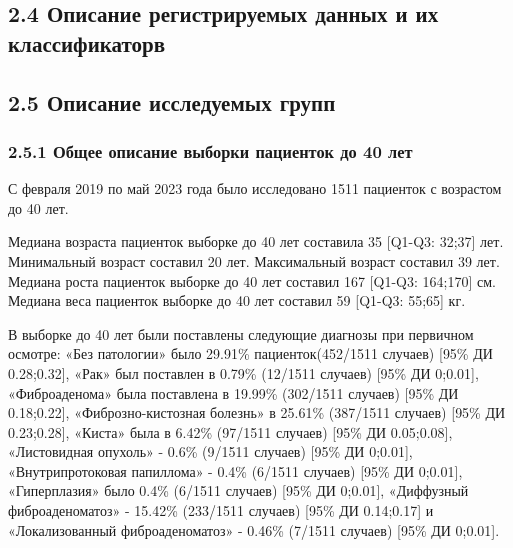 \documentclass[
]{article}
\begin{document}
\hypertarget{ux43eux43fux438ux441ux430ux43dux438ux435-ux440ux435ux433ux438ux441ux442ux440ux438ux440ux443ux435ux43cux44bux445-ux434ux430ux43dux43dux44bux445-ux438-ux438ux445-ux43aux43bux430ux441ux441ux438ux444ux438ux43aux430ux442ux43eux440ux432}{%
\subsection{2.4 Описание регистрируемых данных и их
классификаторв}\label{ux43eux43fux438ux441ux430ux43dux438ux435-ux440ux435ux433ux438ux441ux442ux440ux438ux440ux443ux435ux43cux44bux445-ux434ux430ux43dux43dux44bux445-ux438-ux438ux445-ux43aux43bux430ux441ux441ux438ux444ux438ux43aux430ux442ux43eux440ux432}}

\hypertarget{ux43eux43fux438ux441ux430ux43dux438ux435-ux438ux441ux441ux43bux435ux434ux443ux435ux43cux44bux445-ux433ux440ux443ux43fux43f}{%
\subsection{2.5 Описание исследуемых
групп}\label{ux43eux43fux438ux441ux430ux43dux438ux435-ux438ux441ux441ux43bux435ux434ux443ux435ux43cux44bux445-ux433ux440ux443ux43fux43f}}

\hypertarget{ux43eux431ux449ux435ux435-ux43eux43fux438ux441ux430ux43dux438ux435-ux432ux44bux431ux43eux440ux43aux438-ux43fux430ux446ux438ux435ux43dux442ux43eux43a-ux434ux43e-40-ux43bux435ux442}{%
\subsubsection{2.5.1 Общее описание выборки пациенток до 40
лет}\label{ux43eux431ux449ux435ux435-ux43eux43fux438ux441ux430ux43dux438ux435-ux432ux44bux431ux43eux440ux43aux438-ux43fux430ux446ux438ux435ux43dux442ux43eux43a-ux434ux43e-40-ux43bux435ux442}}

С февраля 2019 по май 2023 года было исследовано 1511 пациенток с
возрастом до 40 лет.

Медиана возраста пациенток выборке до 40 лет составила 35 {[}Q1-Q3:
32;37{]} лет. Минимальный возраст составил 20 лет. Максимальный возраст
составил 39 лет. Медиана роста пациенток выборке до 40 лет составил 167
{[}Q1-Q3: 164;170{]} см. Медиана веса пациенток выборке до 40 лет
составил 59 {[}Q1-Q3: 55;65{]} кг.

В выборке до 40 лет были поставлены следующие диагнозы при первичном
осмотре: «Без патологии» было 29.91\% пациенток(452/1511 случаев)
{[}95\% ДИ 0.28;0.32{]}, «Рак» был поставлен в 0.79\% (12/1511 случаев)
{[}95\% ДИ 0;0.01{]}, «Фиброаденома» была поставлена в 19.99\% (302/1511
случаев) {[}95\% ДИ 0.18;0.22{]}, «Фиброзно-кистозная болезнь» в 25.61\%
(387/1511 случаев) {[}95\% ДИ 0.23;0.28{]}, «Киста» была в 6.42\%
(97/1511 случаев) {[}95\% ДИ 0.05;0.08{]}, «Листовидная опухоль» - 0.6\%
(9/1511 случаев) {[}95\% ДИ 0;0.01{]}, «Внутрипротоковая папиллома» -
0.4\% (6/1511 случаев) {[}95\% ДИ 0;0.01{]}, «Гиперплазия» было 0.4\%
(6/1511 случаев) {[}95\% ДИ 0;0.01{]}, «Диффузный фиброаденоматоз» -
15.42\% (233/1511 случаев) {[}95\% ДИ 0.14;0.17{]} и «Локализованный
фиброаденоматоз» - 0.46\% (7/1511 случаев) {[}95\% ДИ 0;0.01{]}.
\end{document}

